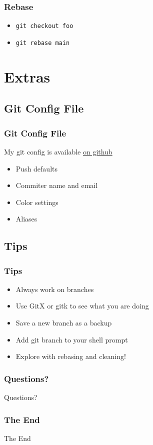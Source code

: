 \begin{frame}
  \frametitle{Rebase}
  \begin{itemize}
    \item \texttt{git checkout foo}
    \item \texttt{git rebase main}
  \end{itemize}
   { }
   { }
\end{frame}

\section{Extras}

\subsection{Git Config File}

\begin{frame}
  \frametitle{Git Config File}
  My git config is available \href{https://github.com/kelsin/dotfiles/blob/main/main/.gitconfig}{on github}
  \begin{itemize}
    \item Push defaults
    \item Commiter name and email
    \item Color settings
    \item Aliases
  \end{itemize}
\end{frame}

\subsection{Tips}

\begin{frame}
  \frametitle{Tips}
  \begin{itemize}
    \item Always work on branches
      \pause
    \item Use GitX or gitk to see what you are doing
      \pause
    \item Save a new branch as a backup
      \pause
    \item Add git branch to your shell prompt
      \pause
    \item Explore with rebasing and cleaning!
  \end{itemize}
\end{frame}

\begin{frame}
  \frametitle{Questions?}
  Questions?
\end{frame}

\begin{frame}
  \frametitle{The End}
  The End
\end{frame}


